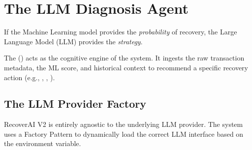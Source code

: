 
\section{The LLM Diagnosis Agent}

\begin{tcolorbox}[summarybox={\iconFlow[1.5] Contextualizing the Failure}]
\color{textdark}
If the Machine Learning model provides the \textit{probability} of recovery, the Large Language Model (LLM) provides the \textit{strategy}. 

The  () acts as the cognitive engine of the system. It ingests the raw transaction metadata, the ML score, and historical context to recommend a specific recovery action (e.g., , , ).
\end{tcolorbox}

\vspace{0.8cm}

\subsection{The LLM Provider Factory}

RecoverAI V2 is entirely agnostic to the underlying LLM provider. The system uses a Factory Pattern to dynamically load the correct LLM interface based on the  environment variable.


